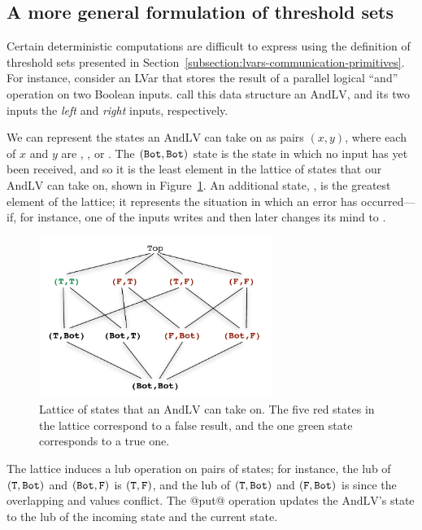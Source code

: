 \subsection{A more general formulation of threshold sets}\label{subsection:lvars-a-more-general-formulation-of-threshold-sets}

Certain deterministic computations are difficult to express using the
definition of threshold sets presented in
Section~\ref{subsection:lvars-communication-primitives}.  For
instance, consider an LVar that stores the result of a parallel
logical ``and'' operation on two Boolean inputs.   call this data
structure an $\mathrm{AndLV}$, and its two inputs the \emph{left} and
\emph{right} inputs, respectively.

We can represent the states an $\mathrm{AndLV}$ can take on as pairs
$(x, y)$, where each of $x$ and $y$ are , , or .
The $(\texttt{Bot},\texttt{Bot})$ state is the state in which no input has yet
been received, and so it is the least element in the lattice of states
that our $\mathrm{AndLV}$ can take on, shown in
Figure~\ref{f:lvars-parallel-and}.  An additional state, , is
the greatest element of the lattice; it represents the situation in
which an error has occurred---if, for instance, one of the inputs
writes  and then later changes its mind to .

\begin{figure}
\begin{center}
  \includegraphics[width=3in]{chapter2/figures/lvars-parallel-and.pdf}
\end{center}
  \caption{Lattice of states that an $\mathrm{AndLV}$ can take on.
    The five red states in the lattice correspond to a false result,
    and the one green state corresponds to a true one.}
  \label{f:lvars-parallel-and}
\end{figure}

The lattice induces a lub operation on pairs of states; for instance,
the lub of $(\texttt{T},\texttt{Bot})$ and $(\texttt{Bot},\texttt{F})$ is $(\texttt{T},\texttt{F})$,
and the lub of $(\texttt{T},\texttt{Bot})$ and $(\texttt{F},\texttt{Bot})$ is  since
the overlapping  and  values conflict.  The @put@
operation updates the $\mathrm{AndLV}$'s state to the lub of the
incoming state and the current state.

